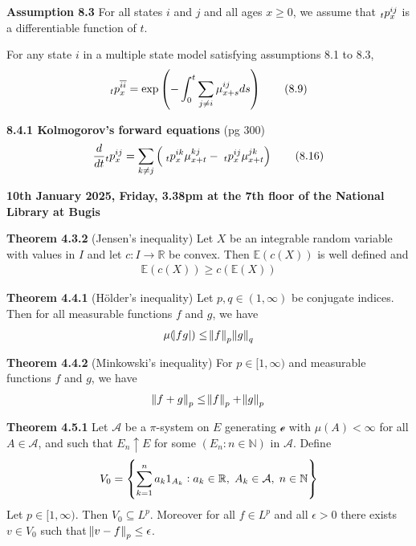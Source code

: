 \documentclass[hidelinks, 12pt]{article}
\theoremstyle{mydefstyle}
\theoremstyle{mythmstyle}
\begin{document}
\textbf{Assumption 8.3} For all states $i$ and $j$ and all ages $x \ge 0$, we assume that $\hspace{0mm}_tp_x^{ij}$ is a differentiable function of $t$.

For any state $i$ in a multiple state model satisfying assumptions 8.1 to 8.3,
\begin{gather*}
\hspace{0mm}_tp_x^{\overline{ii}} = \exp \left( - \int_0^t \sum_{j \ne i} \mu_{x+s}^{ij} ds \right) \tag{8.9}
\end{gather*}

\textbf{8.4.1 Kolmogorov's forward equations} (pg 300)
\begin{gather*}
\frac{d}{dt} \hspace{0mm}_tp_x^{ij} = \sum_{k \ne j} \left( \hspace{1mm}_tp_x^{ik} \mu_{x+t}^{kj} - \hspace{1mm}_tp_x^{ij} \mu_{x+t}^{jk} \right) \tag{8.16}
\end{gather*}

\newpage

\textbf{10th January 2025, Friday, 3.38pm at the 7th floor of the National Library at Bugis}

\textbf{Theorem 4.3.2} (Jensen's inequality) Let $X$ be an integrable random variable with values in $I$ and let $c : I \to \mathbb{R}$ be convex. Then $\mathbb{E}(c(X))$ is well defined and
\begin{gather*}
\mathbb{E}(c(X)) \ge c(\mathbb{E}(X))
\end{gather*}

\textbf{Theorem 4.4.1} (H{\"o}lder's inequality) Let $p, q \in (1, \infty)$ be conjugate indices. Then for all measurable functions $f$ and $g$, we have
\begin{gather*}
\mu(\abs{fg}) \le \norm{f}_p \norm{g}_q
\end{gather*}

\textbf{Theorem 4.4.2} (Minkowski's inequality) For $p \in [1, \infty)$ and measurable functions $f$ and $g$, we have
\begin{gather*}
\norm{f + g}_p \le \norm{f}_p + \norm{g}_p
\end{gather*}

\textbf{Theorem 4.5.1} Let $\mathcal{A}$ be a $\pi$-system on $E$ generating $\mathcal{e}$ with $\mu(A) < \infty$ for all $A \in \mathcal{A}$, and such that $E_n \uparrow E$ for some $(E_n : n \in \mathbb{N})$ in $\mathcal{A}$. Define
\begin{gather*}
V_0 = \left\{ \sum_{k = 1}^n a_k 1_{A_k} : a_k \in \mathbb{R}, \hspace{1mm} A_k \in \mathcal{A}, \hspace{1mm} n \in \mathbb{N} \right\}
\end{gather*}
Let $p \in [1, \infty)$. Then $V_0 \subseteq L^p$. Moreover for all $f \in L^p$ and all $\epsilon > 0$ there exists $v \in V_0$ such that $\norm{v - f}_p \le \epsilon$. 
\end{document}
